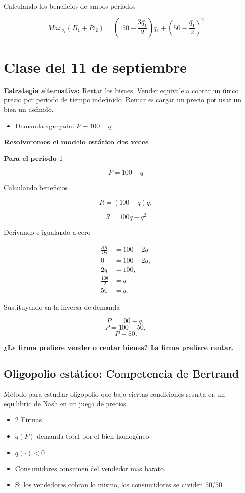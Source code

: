 \documentclass[letterpaper,12pt,twocolumn]{report}
\begin{document}
Calculando los beneficios de ambos periodos


$$Max_{q_1}(\Pi_1+Pi_2)= \left( 150-\dfrac{3\bar{q_1}}{2}\right)q_1 + \left( 50-\dfrac{\bar{q_1}}{2}\right) ^2
$$


\section{Clase del 11 de septiembre}

\textbf{Estrategia alternativa:} Rentar los bienes. Vender equivale a cobrar un único precio por periodo de tiempo indefinido. Rentar es cargar un precio por usar un bien un definido.

\begin{itemize}
	\item Demanda agregada: $ P=100-q $
\end{itemize} 

\textbf{Resolveremos el modelo estático dos veces}

\textbf{Para el periodo 1}

$$ P=100-q $$

Calculando beneficios

$$R = (100-q)q,$$

$$R = 100q-q^2$$

Derivando e igualando a cero

\begin{align*}
	\frac{\partial R}{\partial q} &= 100-2q\\
	0 &= 100-2q, \\
	2q &= 100, \\
	\frac{100}{2} &= q\\
	50 &= q.
\end{align*}

Sustituyendo en la inversa de demanda

$$ P=100-q, $$
$$ P= 100-50, $$
$$ P=50.$$

\textbf{¿La firma prefiere vender o rentar bienes? La firma prefiere rentar.}

\subsection*{Oligopolio estático: Competencia de Bertrand}

Método para estudiar oligopolio que bajo ciertas condiciones resulta en un equilibrio de Nash en un juego de precios.

\begin{itemize}
	\item $2$ Firmas
	\item $q(P)$ demanda total por el bien homogéneo
	\item $ q(\cdot) < 0$
	\item  Consumidores consumen del vendedor más barato.
	\item Si los vendedores cobran lo mismo, los consumidores se dividen $50/50$
\end{itemize}
\end{document}
